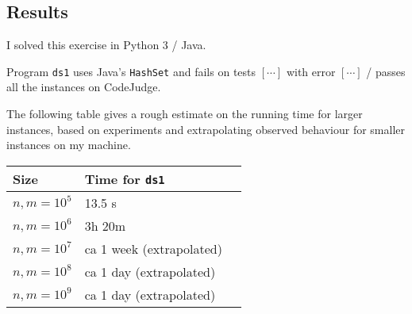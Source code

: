 \documentclass{tufte-handout}
\begin{document}
  \subsection{Results}
  
  I solved this exercise in Python 3 / Java.

  Program \texttt{ds1} uses Java's \texttt{HashSet} and fails on tests $[\cdots]$ with error $[\cdots]$ / passes all the instances on CodeJudge.%

  The following table gives a rough estimate on the running time for larger instances, based on experiments and extrapolating observed behaviour for smaller instances on my machine.

\bigskip
  \begin{tabular}{lll}
  \toprule
    Size          & Time for \texttt{ds1}   \\\midrule
    $n, m = 10^5$ & 13.5 s \\
    $n, m = 10^6$ & 3h 20m  \\
    $n, m = 10^7$ & ca 1 week (extrapolated) \\
    $n, m = 10^8$ & ca 1 day (extrapolated)  \\
    $n, m = 10^9$ & ca 1 day (extrapolated) \\
  \bottomrule
  \end{tabular}
\end{document}
